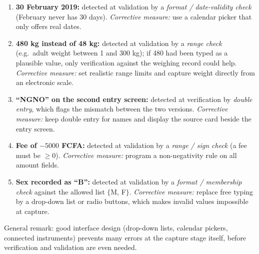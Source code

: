 \documentclass[11pt]{article}
\newcommand{\cle}[1]{{\popxbold\color{popdark}#1}}
\begin{document}
\begin{corrige}
\begin{enumerate}
\item \textbf{30 February 2019:} detected at \cle{validation} by a \emph{format / date-validity check} (February never has 30 days). \emph{Corrective measure:} use a calendar picker that only offers real dates.
\item \textbf{480 kg instead of 48 kg:} detected at \cle{validation} by a \emph{range check} (e.g.\ adult weight between 1 and 300 kg); if 480 had been typed as a plausible value, only \cle{verification} against the weighing record could help. \emph{Corrective measure:} set realistic range limits and capture weight directly from an electronic scale.
\item \textbf{``NGNO'' on the second entry screen:} detected at \cle{verification} by \emph{double entry}, which flags the mismatch between the two versions. \emph{Corrective measure:} keep double entry for names and display the source card beside the entry screen.
\item \textbf{Fee of $-5000$ FCFA:} detected at \cle{validation} by a \emph{range / sign check} (a fee must be $\ge 0$). \emph{Corrective measure:} program a non-negativity rule on all amount fields.
\item \textbf{Sex recorded as ``B'':} detected at \cle{validation} by a \emph{format / membership check} against the allowed list $\{$M, F$\}$. \emph{Corrective measure:} replace free typing by a drop-down list or radio buttons, which makes invalid values impossible at \cle{capture}.
\end{enumerate}
General remark: good interface design (drop-down lists, calendar pickers, connected instruments) prevents many errors at the capture stage itself, before verification and validation are even needed.
\end{corrige}
\end{document}
